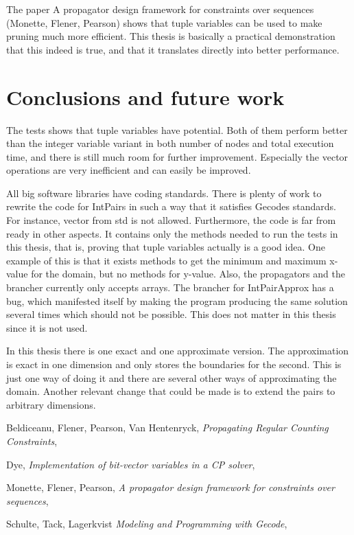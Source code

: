 \documentclass[a4paper,11pt]{article}
\begin{document}
The paper A propagator design framework for constraints over sequences (Monette, Flener, Pearson) shows that tuple variables can be used to make pruning much more efficient. This thesis is basically a practical demonstration that this indeed is true, and that it translates directly into better performance.

\section{Conclusions and future work}
The tests shows that tuple variables have potential. Both of them perform better than the integer variable variant in both number of nodes and total execution time, and there is still much room for further improvement. Especially the vector operations are very inefficient and can easily be improved.

All big software libraries have coding standards. There is plenty of work to rewrite the code for IntPairs in such a way that it satisfies Gecodes standards. For instance, vector from std is not allowed. Furthermore, the code is far from ready in other aspects. It contains only the methods needed to run the tests in this thesis, that is, proving that tuple variables actually is a good idea. One example of this is that it exists methods to get the minimum and maximum x-value for the domain, but no methods for y-value. Also, the propagators and the brancher currently only accepts arrays. The brancher for IntPairApprox has a bug, which manifested itself by making the program producing the same solution several times which should not be possible. This does not matter in this thesis since it is not used.

In this thesis there is one exact and one approximate version. The approximation is exact in one dimension and only stores the boundaries for the second. This is just one way of doing it and there are several other ways of approximating the domain. Another relevant change that could be made is to extend the pairs to arbitrary dimensions.

\begin{thebibliography}{9}

  Beldiceanu, Flener, Pearson, Van Hentenryck,
  \emph{Propagating Regular Counting Constraints},

  Dye,
  \emph{Implementation of bit-vector variables in a CP solver},

  Monette, Flener, Pearson,
  \emph{A propagator design framework for constraints over sequences},

  Schulte, Tack, Lagerkvist
  \emph{Modeling and Programming with Gecode},

\end{thebibliography}
\end{document}
